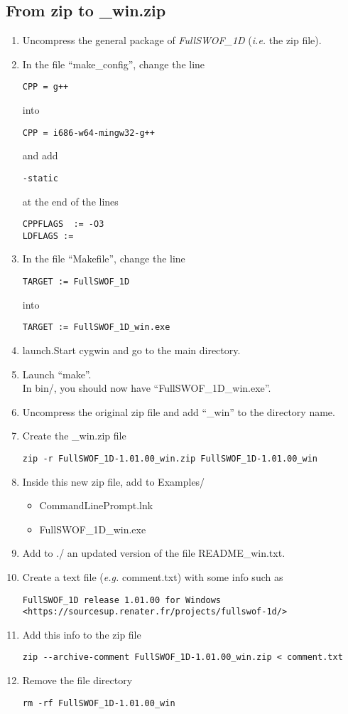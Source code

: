 \documentclass[a4paper, 11pt]{article}
\newcommand{\FullSWOFoneD}{\emph{FullSWOF\_1D}}
\begin{document}
\subsection{From zip to \_win.zip}
\begin{enumerate}
\item Uncompress the general package of \FullSWOFoneD{} (\emph{i.e.} the zip file).
\item In the file ``make\_config'', change the line
\begin{verbatim}
CPP = g++
\end{verbatim}
into
\begin{verbatim}
CPP = i686-w64-mingw32-g++
\end{verbatim}
and add
\begin{verbatim}
-static
\end{verbatim}
at the end of the lines
\begin{verbatim}
CPPFLAGS  := -O3
LDFLAGS :=
\end{verbatim}
\item In the file ``Makefile'', change the line
\begin{verbatim}
TARGET := FullSWOF_1D
\end{verbatim}
into
\begin{verbatim}
TARGET := FullSWOF_1D_win.exe
\end{verbatim}
\item launch.Start cygwin and go to the main directory.
\item Launch ``make''.\\
In bin/, you should now have ``FullSWOF\_1D\_win.exe''.
\item Uncompress the original zip file and add ``\_win'' to the directory name.
\item Create the \_win.zip file
\begin{verbatim}
zip -r FullSWOF_1D-1.01.00_win.zip FullSWOF_1D-1.01.00_win
\end{verbatim}
\item Inside this new zip file, add to Examples/
	\begin{itemize}
		\item CommandLinePrompt.lnk
		\item FullSWOF\_1D\_win.exe
	\end{itemize}
\item Add to ./ an updated version of the file README\_win.txt.
\item Create a text file (\emph{e.g.} comment.txt) with some info such as
\begin{verbatim}
FullSWOF_1D release 1.01.00 for Windows
<https://sourcesup.renater.fr/projects/fullswof-1d/>
\end{verbatim}
\item Add this info to the zip file
\begin{verbatim}
zip --archive-comment FullSWOF_1D-1.01.00_win.zip < comment.txt
\end{verbatim}
\item Remove the file directory
\begin{verbatim}
rm -rf FullSWOF_1D-1.01.00_win
\end{verbatim}


\end{enumerate}
\end{document}

